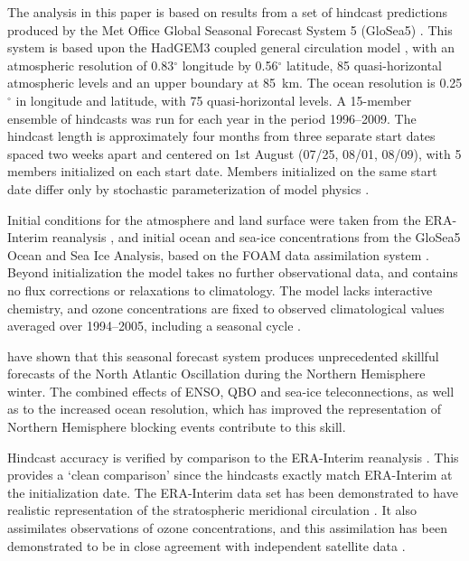 The analysis in this paper is based on results from a set of hindcast predictions produced by the Met Office Global Seasonal Forecast System 5 (GloSea5) \citep{MacLachlan2014}. This system is based upon the HadGEM3 coupled general circulation model \citep{Hewitt2011}, with an atmospheric resolution of 0.83$^{\circ}$ longitude by 0.56$^{\circ}$ latitude, 85 quasi-horizontal atmospheric levels and an upper boundary at 85~km. The ocean resolution is 0.25$^{\circ}$ in longitude and latitude, with 75 quasi-horizontal levels. A 15-member ensemble of hindcasts was run for each year in the period 1996--2009. The hindcast length is approximately four months from three separate start dates spaced two weeks apart and centered on 1st August (07/25, 08/01, 08/09), with 5 members initialized on each start date. Members initialized on the same start date differ only by stochastic parameterization of model physics \citep{Tennant2011}.

Initial conditions for the atmosphere and land surface were taken from the ERA-Interim reanalysis \citep{Dee2011}, and initial ocean and sea-ice concentrations from the GloSea5 Ocean and Sea Ice Analysis, based on the FOAM data assimilation system \citep{Blockley2013}. Beyond initialization the model takes no further observational data, and contains no flux corrections or relaxations to climatology. The model lacks interactive chemistry, and ozone concentrations are fixed to observed climatological values averaged over 1994--2005, including a seasonal cycle \citep{Cionni2011}.

\citet{Scaife2013} have shown that this seasonal forecast system produces unprecedented skillful forecasts of the North Atlantic Oscillation during the Northern Hemisphere winter. The combined effects of ENSO, QBO and sea-ice teleconnections, as well as to the increased ocean resolution, which has improved the representation of Northern Hemisphere blocking events \citep{Scaife2011a} contribute to this skill.

Hindcast accuracy is verified by comparison to the ERA-Interim reanalysis \citep{Dee2011}. This provides a `clean comparison' since the hindcasts exactly match ERA-Interim at the initialization date. The ERA-Interim data set has been demonstrated to have realistic representation of the stratospheric meridional circulation \citep{Seviour2012, Monge-Sanz2013}. It also assimilates observations of ozone concentrations, and this assimilation has been demonstrated to be in close agreement with independent satellite data \citep{Dragani2011}.

